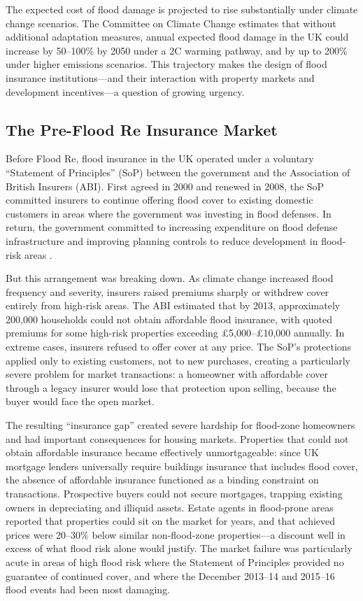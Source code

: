 \documentclass[12pt]{article}
\begin{document}
The expected cost of flood damage is projected to rise substantially under climate change scenarios. The Committee on Climate Change estimates that without additional adaptation measures, annual expected flood damage in the UK could increase by 50--100\% by 2050 under a 2\textdegree C warming pathway, and by up to 200\% under higher emissions scenarios. This trajectory makes the design of flood insurance institutions---and their interaction with property markets and development incentives---a question of growing urgency.

\subsection{The Pre-Flood Re Insurance Market}

Before Flood Re, flood insurance in the UK operated under a voluntary ``Statement of Principles'' (SoP) between the government and the Association of British Insurers (ABI). First agreed in 2000 and renewed in 2008, the SoP committed insurers to continue offering flood cover to existing domestic customers in areas where the government was investing in flood defenses. In return, the government committed to increasing expenditure on flood defense infrastructure and improving planning controls to reduce development in flood-risk areas \citep{defra2012partnership}.

But this arrangement was breaking down. As climate change increased flood frequency and severity, insurers raised premiums sharply or withdrew cover entirely from high-risk areas. The ABI estimated that by 2013, approximately 200,000 households could not obtain affordable flood insurance, with quoted premiums for some high-risk properties exceeding \pounds5,000--\pounds10,000 annually. In extreme cases, insurers refused to offer cover at any price. The SoP's protections applied only to existing customers, not to new purchases, creating a particularly severe problem for market transactions: a homeowner with affordable cover through a legacy insurer would lose that protection upon selling, because the buyer would face the open market.

The resulting ``insurance gap'' created severe hardship for flood-zone homeowners and had important consequences for housing markets. Properties that could not obtain affordable insurance became effectively unmortgageable: since UK mortgage lenders universally require buildings insurance that includes flood cover, the absence of affordable insurance functioned as a binding constraint on transactions. Prospective buyers could not secure mortgages, trapping existing owners in depreciating and illiquid assets. Estate agents in flood-prone areas reported that properties could sit on the market for years, and that achieved prices were 20--30\% below similar non-flood-zone properties---a discount well in excess of what flood risk alone would justify. The market failure was particularly acute in areas of high flood risk where the Statement of Principles provided no guarantee of continued cover, and where the December 2013--14 and 2015--16 flood events had been most damaging.
\end{document}
